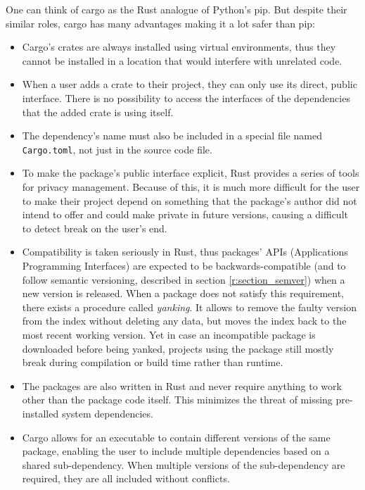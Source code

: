 \documentclass[licencjacka,en]{pracamgr}
\begin{document}
One can think of cargo as the Rust analogue of Python's pip. But despite their similar roles,
cargo has many advantages making it a lot safer than pip:
\begin{itemize}
	\item Cargo's crates are always installed using virtual environments, thus they cannot be
		installed in a location that would interfere with unrelated code.
	\item When a user adds a crate to their project, they can only use its direct, public interface.
		There is no possibility to access the interfaces of the dependencies that the added crate
		is using itself.
	\item The dependency's name must also be included in a special file named \texttt{Cargo.toml},
		not just in the source code file.
	\item To make the package's public interface explicit, Rust provides a series of tools for
		privacy management. Because of this, it is much more difficult for the user to make their
		project depend on something that the package's author did not intend to offer and could
		make private in future versions, causing a difficult to detect break on the user's end.
	\item Compatibility is taken seriously in Rust, thus packages' APIs (Applications Programming
		Interfaces) are expected to be backwards-compatible (and to follow semantic versioning,
		described in section \ref{r:section_semver}) when a new version is released. When a package
		does not satisfy this requirement, there exists a procedure called \textit{yanking}.
		It allows to remove the faulty version from the index without deleting any data, but moves
		the index back to the most recent working version. Yet in case an incompatible package is
		downloaded before being yanked, projects using the package still mostly break during
		compilation or build time rather than runtime.
	\item The packages are also written in Rust and never require anything to work other than the
		package code itself. This minimizes the threat of missing pre-installed
		system dependencies.
	\item Cargo allows for an executable to contain different versions of the same package,
		enabling the user to include multiple dependencies based on a shared sub-dependency.
		When multiple versions of the sub-dependency are required, they are all included
		without conflicts.
\end{itemize}
\end{document}
